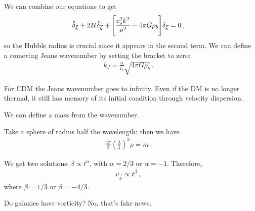 \documentclass[main.tex]{subfiles}
\begin{document}
We can combine our equations to get 
%
\begin{align}
\ddot{\delta}_{\vec{k}} + 2 H \dot{\delta}_{\vec{k}} + \qty[\frac{c_s^2 k^2}{a^2} - 4 \pi G \rho_{b}] \delta_{\vec{k}} = 0
\,,
\end{align}
%
so the Hubble radius is crucial since it appears in the second term.
We can define a comoving Jeans wavenumber by setting the bracket to zero: 
%
\begin{align}
k_J = \frac{a}{c_s} \sqrt{4 \pi G \rho_{b}}
\,.
\end{align}

For CDM the Jeans wavenumber goes to infinity. 
Even if the DM is no longer thermal, it still has memory of its initial condition through velocity dispersion. 

We can define a mass from the wavenumber.

Take a sphere of radius half the wavelength: then we have 
%
\begin{align}
\frac{4\pi}{3} ( \frac{\lambda}{2} )^3 \rho  = m 
\,.
\end{align}

We get two solutions: \(\delta \propto t^{\alpha }\), with \(\alpha = 2/3\) or \(\alpha = -1\). Therefore, 
%
\begin{align}
v_{\vec{k}} \propto t^{\beta }
\,,
\end{align}
%
where \(\beta = 1/3\) or \(\beta = -4/3\). 

Do galaxies have vorticity? No, that's fake news.
\end{document}
